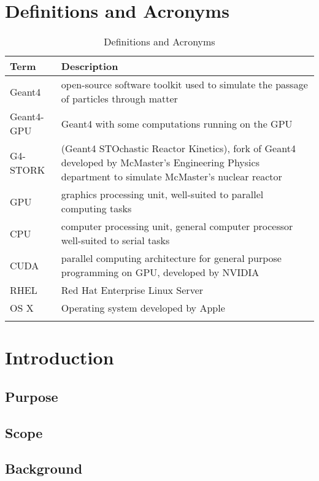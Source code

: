 \documentclass[12pt]{article}
\begin{document}
\section{Definitions and Acronyms} %
\begin{table}[h]
\centering
\caption{Definitions and Acronyms}
\begin{tabularx}{\textwidth}{l|X}
\Xhline{2\arrayrulewidth}
\bf Term & \bf Description\\
\hline
Geant4 & open-source software toolkit used to simulate the passage of particles through matter\\\hline
Geant4-GPU & Geant4 with some computations running on the GPU\\\hline
G4-STORK & (Geant4 STOchastic Reactor Kinetics), fork of Geant4 developed by McMaster's Engineering Physics department to simulate McMaster's nuclear reactor\\\hline
GPU & graphics processing unit, well-suited to parallel computing tasks\\\hline
CPU & computer processing unit, general computer processor well-suited to serial tasks\\\hline
CUDA & parallel computing architecture for general purpose programming on GPU, developed by NVIDIA\\\hline
RHEL & Red Hat Enterprise Linux Server\\\hline
OS X & Operating system developed by Apple\\
\Xhline{2\arrayrulewidth}
\end{tabularx}
\end{table}



\section{Introduction} %
\subsection{Purpose} %
\subsection{Scope} %
\subsection{Background} %
\end{document}
